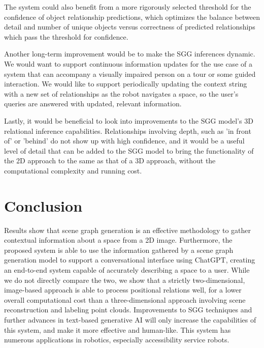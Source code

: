 \documentclass[letterpaper, 10 pt, conference]{ieeeconf}  %
\begin{document}
    The system could also benefit from a more rigorously selected threshold for the confidence of object relationship predictions, which optimizes the balance between detail and number of unique objects versus correctness of predicted relationships which pass the threshold for confidence.

    Another long-term improvement would be to make the SGG inferences dynamic. We would want to support continuous information updates for the use case of a system that can accompany a visually impaired person on a tour or some guided interaction. We would like to support periodically updating the context string with a new set of relationships as the robot navigates a space, so the user's queries are answered with updated, relevant information.

    Lastly, it would be beneficial to look into improvements to the SGG model's 3D relational inference capabilities. Relationships involving depth, such as 'in front of' or 'behind' do not show up with high confidence, and it would be a useful level of detail that can be added to the SGG model to bring the functionality of the 2D approach to the same as that of a 3D approach, without the computational complexity and running cost.

\section{Conclusion}
    Results show that scene graph generation is an effective methodology to gather contextual information about a space from a 2D image. Furthermore, the proposed system is able to use the information gathered by a scene graph generation model to support a conversational interface using ChatGPT, creating an end-to-end system capable of accurately describing a space to a user. While we do not directly compare the two, we show that a strictly two-dimensional, image-based approach is able to process positional relations well, for a lower overall computational cost than a three-dimensional approach involving scene reconstruction and labeling point clouds. Improvements to SGG techniques and further advances in text-based generative AI will only increase the capabilities of this system, and make it more effective and human-like. This system has numerous applications in robotics, especially accessibility service robots.
\end{document}
